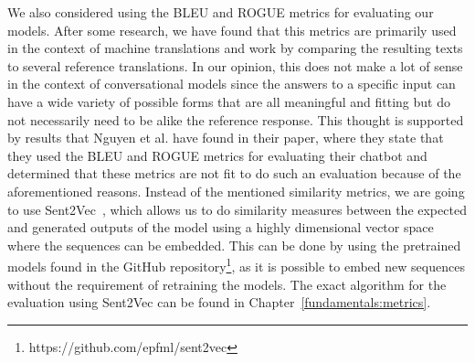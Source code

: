 We also considered using the BLEU and ROGUE metrics for evaluating our models. After some research, we have found that this metrics are primarily used in the context of machine translations and work by comparing the resulting texts to several reference translations. In our opinion, this does not make a lot of sense in the context of conversational models since the answers to a specific input can have a wide variety of possible forms that are all meaningful and fitting but do not necessarily need to be alike the reference response. This thought is supported by results that Nguyen et al. \cite{Nguyen:2016} have found in their paper, where they state that they used the BLEU and ROGUE metrics for evaluating their chatbot and determined that these metrics are not fit to do such an evaluation because of the aforementioned reasons. Instead of the mentioned similarity metrics, we are going to use Sent2Vec~\cite{Pgj:2017}, which allows us to do similarity measures between the expected and generated outputs of the model using a highly dimensional vector space where the sequences can be embedded. This can be done by using the pretrained models found in the GitHub repository\footnote{https://github.com/epfml/sent2vec}, as it is possible to embed new sequences without the requirement of retraining the models. The exact algorithm for the evaluation using Sent2Vec can be found in Chapter~\ref{fundamentals:metrics}.
